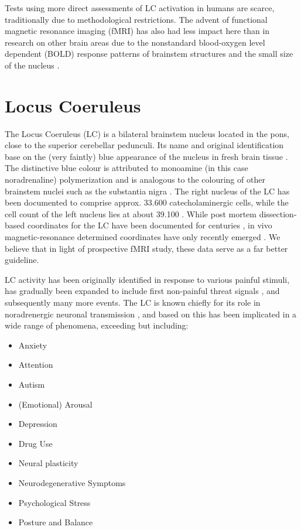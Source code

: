 	Tests using more direct assessments of LC activation in humans are scarce, traditionally due to methodological restrictions.
	The advent of functional magnetic resonance imaging (fMRI) has also had less impact here than in research on other brain areas due to the nonstandard blood-oxygen level dependent (BOLD) response patterns of brainstem structures and the small size of the nucleus \citep{Astafiev2010}.
	
    \section{Locus Coeruleus}\label{sec:b_lc}
	The Locus Coeruleus (LC) is a bilateral brainstem nucleus located in the pons, close to the superior cerebellar pedunculi.
	Its name and original identification base on the (very faintly) blue appearance of the nucleus in fresh brain tissue \citep{Maeda2000}.
	The distinctive blue colour is attributed to monoamine (in this case noradrenaline) polymerization and is analogous to the colouring of other brainstem nuclei such as the substantia nigra \citep{Mai2011}.
	The right nucleus of the LC has been documented to comprise approx. 33.600 catecholaminergic cells, while the cell count of the left nucleus lies at about 39.100 \citep{Mouton1994}.
	While post mortem dissection-based coordinates for the LC have been documented for centuries \citep{Maeda2000},
	in vivo magnetic-resonance determined coordinates have only recently emerged \citep{Keren2009}. 
	We believe that in light of prospective fMRI study, these data serve as a far better guideline. 
		
	LC activity has been originally identified in response to various painful stimuli, has gradually been expanded to include first non-painful threat signals \citep{Grant1984}, and subsequently many more events.
	The LC is known chiefly for its role in noradrenergic neuronal transmission \citep{Benarroch2009}, and based on this has been implicated in a wide range of phenomena, exceeding but including:
	\begin{multicols}{2}
	    \begin{itemize}
		\item Anxiety \citep{Weiss1994}
		\item Attention \citep{Benarroch2009}
		\item Autism \citep{Mehler2009}
		\item (Emotional) Arousal \citep{Bangasser2011}
		\item Depression \citep{Weiss1994}
		\item Drug Use \citep{Samuels2008}
		\item Neural plasticity \citep{Benarroch2009}
		\item Neurodegenerative Symptoms \citep{Gesi2000}
		\item Psychological Stress \citep{Bangasser2011}
		\item Posture and Balance \citep{Benarroch2009}
	    \end{itemize}
	\end{multicols}
	
